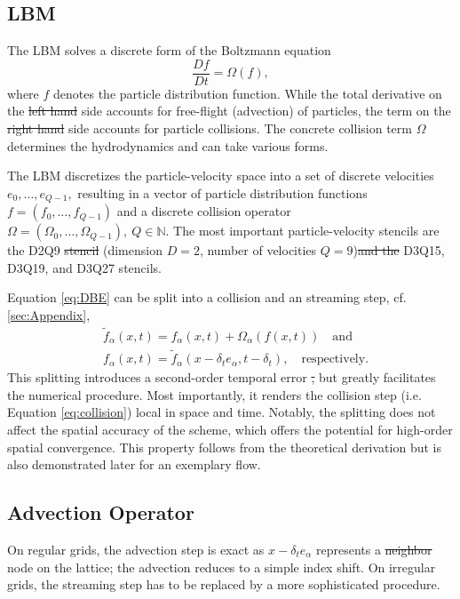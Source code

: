 \documentclass[1p, sort&compress]{elsarticle}
\providecommand{\DIFaddtex}[1]{{\protect\color{blue}\uwave{#1}}} %
\providecommand{\DIFdeltex}[1]{{\protect\color{red}\sout{#1}}}                      %
\providecommand{\DIFaddbegin}{} %
\providecommand{\DIFaddend}{} %
\providecommand{\DIFdelbegin}{} %
\providecommand{\DIFdelend}{} %
\providecommand{\DIFadd}[1]{\texorpdfstring{\DIFaddtex{#1}}{#1}} %
\providecommand{\DIFdel}[1]{\texorpdfstring{\DIFdeltex{#1}}{}} %
\newcommand{\DIFscaledelfig}{0.5}
\newlength{\DIFdelgraphicswidth} %
\newlength{\DIFdelgraphicsheight} %
\newcommand{\DIFaddincludegraphics}[2][]{{\color{blue}\fbox{\DIFOincludegraphics[#1]{#2}}}} %
\newcommand{\DIFdelincludegraphics}[2][]{%
\sbox{\DIFdelgraphicsbox}{\DIFOincludegraphics[#1]{#2}}%
\settoboxwidth{\DIFdelgraphicswidth}{\DIFdelgraphicsbox} %
\settoboxtotalheight{\DIFdelgraphicsheight}{\DIFdelgraphicsbox} %
\scalebox{\DIFscaledelfig}{%
\parbox[b]{\DIFdelgraphicswidth}{\usebox{\DIFdelgraphicsbox}\\[-\baselineskip] \rule{\DIFdelgraphicswidth}{0em}}\llap{\resizebox{\DIFdelgraphicswidth}{\DIFdelgraphicsheight}{%
\setlength{\unitlength}{\DIFdelgraphicswidth}%
\begin{picture}(1,1)%
\thicklines\linethickness{2pt} %
{\color[rgb]{1,0,0}\put(0,0){\framebox(1,1){}}}%
{\color[rgb]{1,0,0}\put(0,0){\line( 1,1){1}}}%
{\color[rgb]{1,0,0}\put(0,1){\line(1,-1){1}}}%
\end{picture}%
}\hspace*{3pt}}} %
} %
\DeclareRobustCommand{\DIFaddbegin}{\DIFOaddbegin \let\includegraphics\DIFaddincludegraphics} %
\DeclareRobustCommand{\DIFaddend}{\DIFOaddend \let\includegraphics\DIFOincludegraphics} %
\DeclareRobustCommand{\DIFdelbegin}{\DIFOdelbegin \let\includegraphics\DIFdelincludegraphics} %
\DeclareRobustCommand{\DIFdelend}{\DIFOaddend \let\includegraphics\DIFOincludegraphics} %
\begin{document}
\subsection{LBM}
The LBM solves a discrete form of the Boltzmann equation
\begin{equation}
	\label{eq:DBE}
	\frac{Df}{Dt} = \Omega(f),
\end{equation}
where $f$ denotes the particle distribution function. While the total derivative on the \DIFdelbegin \DIFdel{left hand }\DIFdelend \DIFaddbegin \DIFadd{left-hand }\DIFaddend side accounts for free-flight (advection) of particles, the term on the \DIFdelbegin \DIFdel{right hand }\DIFdelend \DIFaddbegin \DIFadd{right-hand }\DIFaddend side accounts for particle collisions. The concrete collision term $\Omega$ determines the hydrodynamics and can take various forms.

The LBM discretizes the particle-velocity space into a set of discrete velocities $e_0,\dots,e_{Q-1},$ resulting in a vector of particle distribution functions $f=(f_0,\dots,f_{Q-1})$ and a discrete collision operator $\Omega=(\Omega_{0},\dots,\Omega_{Q-1}),\ Q \in \mathbb{N}.$
The most important particle-velocity stencils are the D2Q9 \DIFdelbegin \DIFdel{stencil }\DIFdelend (dimension $D=2$, number of velocities $Q=9$)\DIFdelbegin \DIFdel{and the }\DIFdelend \DIFaddbegin \DIFadd{, }\DIFaddend D3Q15, D3Q19, and D3Q27 stencils.

Equation \eqref{eq:DBE} can be split into a collision and an streaming step, cf. \ref{sec:Appendix},
\begin{align}
	\label{eq:collision}
	&\tilde{f}_{\alpha} (x,t) = f_{\alpha} (x,t) + \Omega_{\alpha} \left( f(x,t) \right) 
		\quad \mathrm{and}\\
	\label{eq:streaming}
	&f_{\alpha} ( x,t ) = \tilde{f}_{\alpha} (x - \delta_t e_\alpha, t-\delta_t),
		\quad \mathrm{respectively.}
\end{align}
This splitting introduces a second-order temporal error \DIFdelbegin \DIFdel{, }\DIFdelend but greatly facilitates the numerical procedure. Most importantly, it renders the collision step (i.e. Equation \eqref{eq:collision}) local in space and time. Notably, the splitting does not affect the spatial accuracy of the scheme, which offers the potential for high-order spatial convergence. This property follows from the theoretical derivation but is also demonstrated later for an exemplary flow.

\subsection{Advection Operator}
On regular grids, the advection step is exact as $x-\delta_t e_{\alpha}$ represents a \DIFdelbegin \DIFdel{neighbor }\DIFdelend \DIFaddbegin \DIFadd{neighboring }\DIFaddend node on the lattice; the advection reduces to a simple index shift. On irregular grids, the streaming step has to be replaced by a more sophisticated procedure. 
\end{document}

